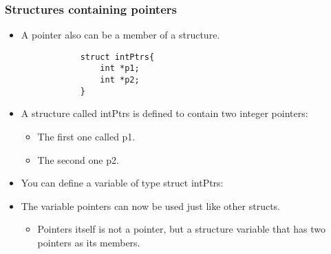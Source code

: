 \subsubsection{Structures containing pointers}
\begin{itemize}
    \item A pointer also can be a member of a structure. 
        \begin{verbatim}
            struct intPtrs{
                int *p1;
                int *p2;
            }
        \end{verbatim}

    \item A structure called intPtrs is defined to contain two integer pointers:
        \begin{itemize}
            \item The first one called p1.
            \item The second one p2.
        \end{itemize}
    
    \item You can define a variable of type struct intPtrs:
    
    \item The variable pointers can now be used just like other structs.
        \begin{itemize}
            \item Pointers itself is not a pointer, but a structure variable that has two pointers as its members. 
        \end{itemize}
\end{itemize}

